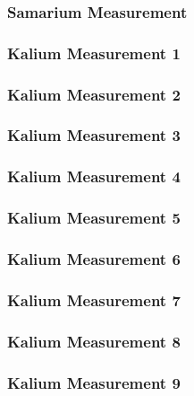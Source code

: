 \documentclass[12pt]{article}
\begin{document}
\subsubsection{Samarium Measurement}

\subsubsection{Kalium Measurement 1}

\subsubsection{Kalium Measurement 2}

\subsubsection{Kalium Measurement 3}

\subsubsection{Kalium Measurement 4}

\subsubsection{Kalium Measurement 5}

\subsubsection{Kalium Measurement 6}

\subsubsection{Kalium Measurement 7}

\subsubsection{Kalium Measurement 8}

\subsubsection{Kalium Measurement 9}

%
\end{document}
